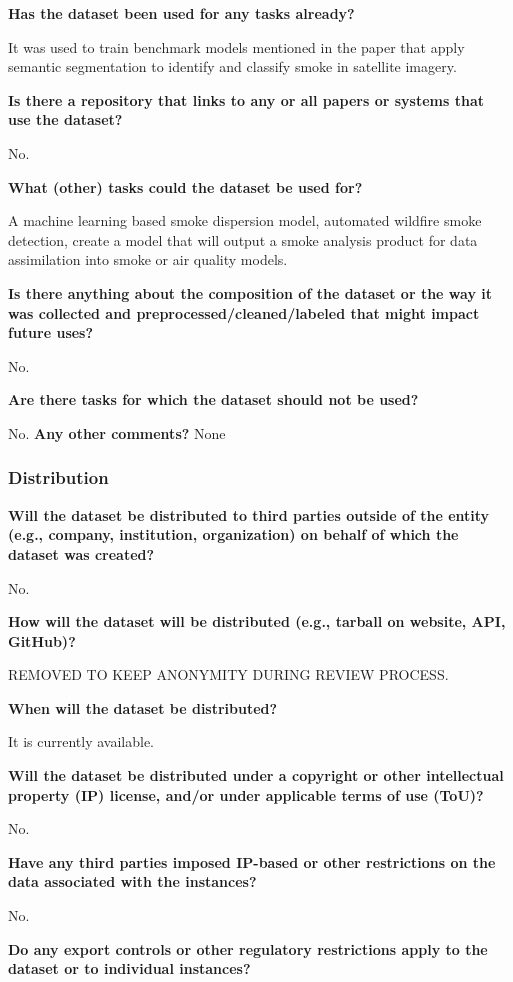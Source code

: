 \documentclass{article}
\begin{document}
\textbf{Has the dataset been used for any tasks already?}

It was used to train benchmark models mentioned in the paper that apply semantic segmentation to identify and classify smoke in satellite imagery.

\textbf{Is there a repository that links to any or all papers or systems that use the dataset?}

No.

\textbf{What (other) tasks could the dataset be used for?}

A machine learning based smoke dispersion model, automated wildfire smoke detection, create a model that will output a smoke analysis product for data assimilation into smoke or air quality models.

\textbf{Is there anything about the composition of the dataset or the way it was collected and preprocessed/cleaned/labeled that might impact future uses?}

No.

\textbf{Are there tasks for which the dataset should not be used?}

No.
\textbf{Any other comments?}
None

\subsubsection{Distribution}

\textbf{Will the dataset be distributed to third parties outside of the entity (e.g., company, institution, organization) on behalf of which the dataset was created? }

No.

\textbf{How will the dataset will be distributed (e.g., tarball on website, API, GitHub)?}

REMOVED TO KEEP ANONYMITY DURING REVIEW PROCESS.

\textbf{When will the dataset be distributed?}

It is currently available.

\textbf{Will the dataset be distributed under a copyright or other intellectual property (IP) license, and/or under applicable terms of use (ToU)?}

No.

\textbf{Have any third parties imposed IP-based or other restrictions on the data associated with the instances?}

No.

\textbf{Do any export controls or other regulatory restrictions apply to the dataset or to individual instances?}
\end{document}
